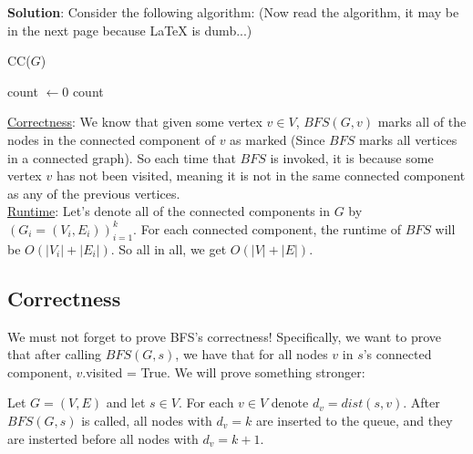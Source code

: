 \textbf{Solution}: Consider the following algorithm: (Now read the algorithm, it may be in the next page because LaTeX is dumb...)
\begin{algbox}{CC($G$)}
  \begin{algorithm}[H]
     count $\leftarrow 0$
	\Return count
  \end{algorithm}
\end{algbox}
\underline{Correctness}: We know that given some vertex $v\in V$, $BFS(G, v)$ marks all of the nodes in the connected component of $v$ as marked (Since $BFS$ marks all vertices in a connected graph). So each time that $BFS$ is invoked, it is because some vertex $v$ has not been visited, meaning it is not in the same connected component as any of the previous vertices. \\

\underline{Runtime}: Let's denote all of the connected components in $G$ by $(G_i=(V_i , E_i))_{i=1}^k$. For each connected component, the runtime of $BFS$ will be $O(|V_i|+|E_i|)$. So all in all, we get $O(|V|+|E|)$.

\subsection{Correctness}

We must not forget to prove BFS's correctness! Specifically, we want to prove that after calling $BFS(G, s)$, we have that for all nodes $v$ in $s$'s connected component, $v$.visited = True. We will prove something stronger:

\begin{prop}
Let $G=(V,E)$ and let $s\in V$. For each $v\in V$ denote $d_v=dist(s, v)$. 
After $BFS(G,s)$ is called, all nodes with $d_v=k$ are inserted to the queue, and they are insterted before all nodes with $d_v=k+1$.
\end{prop}

